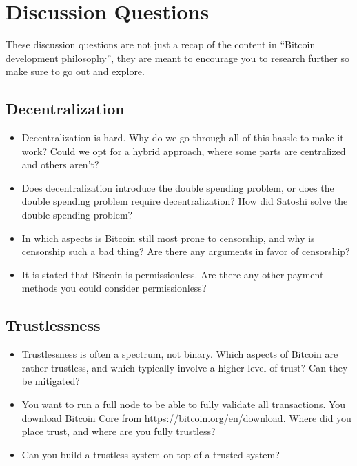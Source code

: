 \hypertarget{appendixdiscussion}{%
\section{Discussion Questions}\label{appendixdiscussion}}

These discussion questions are not just a recap of the content in
``Bitcoin development philosophy'', they are meant to encourage you to
research further so make sure to go out and explore.

\hypertarget{_decentralization}{%
\subsection{Decentralization}\label{_decentralization}}

\begin{itemize}
\item
  Decentralization is hard. Why do we go through all of this hassle to
  make it work? Could we opt for a hybrid approach, where some parts are
  centralized and others aren't?
\item
  Does decentralization introduce the double spending problem, or does
  the double spending problem require decentralization? How did Satoshi
  solve the double spending problem?
\item
  In which aspects is Bitcoin still most prone to censorship, and why is
  censorship such a bad thing? Are there any arguments in favor of
  censorship?
\item
  It is stated that Bitcoin is permissionless. Are there any other
  payment methods you could consider permissionless?
\end{itemize}

\hypertarget{_trustlessness}{%
\subsection{Trustlessness}\label{_trustlessness}}

\begin{itemize}
\item
  Trustlessness is often a spectrum, not binary. Which aspects of
  Bitcoin are rather trustless, and which typically involve a higher
  level of trust? Can they be mitigated?
\item
  You want to run a full node to be able to fully validate all
  transactions. You download Bitcoin Core from
  \url{https://bitcoin.org/en/download}. Where did you place trust, and
  where are you fully trustless?
\item
  Can you build a trustless system on top of a trusted system?
\end{itemize}

